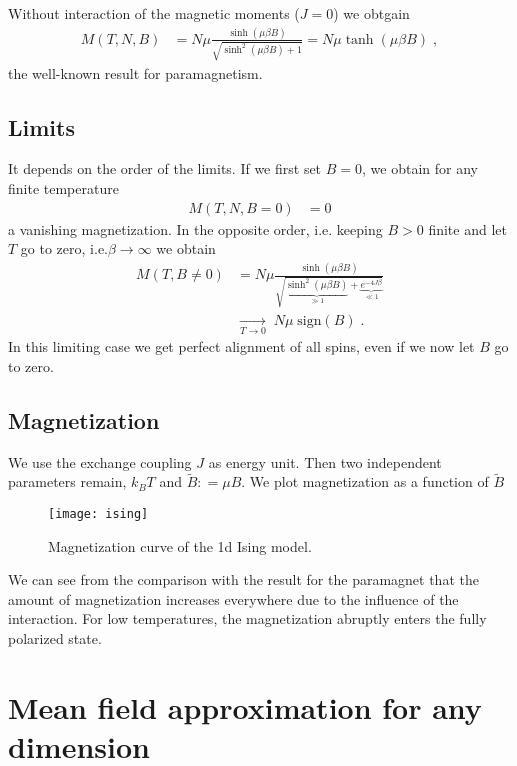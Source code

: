 Without interaction of the magnetic moments  ($J=0$) we obtgain
\begin{align*}
M(T,N,B) &= N \mu \frac{\sinh(\mu \beta B)}{\sqrt{\sinh^{2}(\mu\beta B) + 1}}
= N \mu \tanh(\mu\beta B)\;,
\end{align*}
%
the well-known result for paramagnetism.


\subsection{Limits}

It depends on the order of the limits. If we first set $B=0$, we obtain for any finite temperature
%
\begin{align*}
M(T,N,B=0) &= 0
\end{align*}
%
a vanishing magnetization.
In the opposite order, i.e. keeping $B>0$ finite and let  $T$ go to zero, i.e.$\beta\to\infty$ we obtain
%
\begin{align*}
M(T,B\ne 0) &=
N \mu \frac{\sinh(\mu \beta B)}{\sqrt{\underbrace{\sinh^{2}(\mu\beta B)}_{\gg 1} + \underbrace{e^{-4 J \beta}}_{\ll 1}}}\\
&\underset{T\to 0}{\longrightarrow} \;N \mu\;\text{sign}(B)\;.
\end{align*}
%
In this limiting  case we get perfect alignment of all spins, even if we now let $B$ go to zero. 

\pagebreak
\subsection{Magnetization}


We use the exchange coupling $J$ as  energy unit. Then two independent parameters remain, $k_{B}T$ and $\tilde B: = \mu B$. We plot magnetization as a function of $\tilde B$
\begin{figure}[h]
  \centering
  \texttt{[image: ising]}
  \caption{Magnetization curve of the 1d Ising model.}
\end{figure}

We can see from the comparison with the result for the paramagnet that the amount of magnetization increases everywhere due to the influence of the interaction. For low temperatures, the magnetization abruptly enters the fully polarized state.

\section{Mean field approximation for any dimension}

